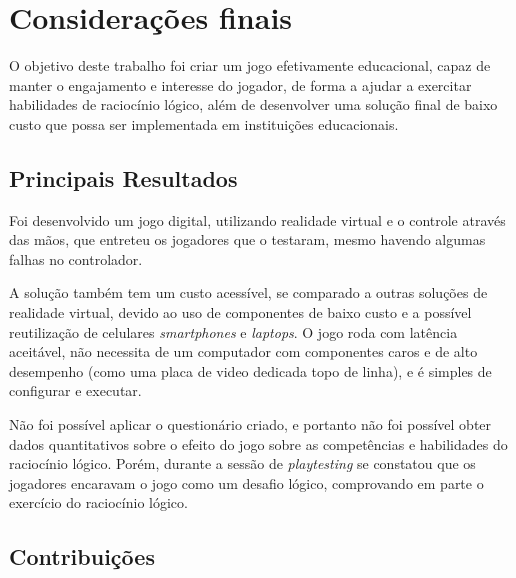 
\chapter{Considerações finais}\label{cap-consideracoes-finais}

O objetivo deste trabalho foi criar um jogo efetivamente educacional, capaz de manter o engajamento e interesse do jogador, de forma a ajudar a exercitar habilidades de raciocínio lógico, além de desenvolver uma solução final de baixo custo que possa ser implementada em instituições educacionais.

\section{Principais Resultados}\label{sec-conc-resultados}

Foi desenvolvido um jogo digital, utilizando realidade virtual e o controle através das mãos, que entreteu os jogadores que o testaram, mesmo havendo algumas falhas no controlador. 

A solução também tem um custo acessível, se comparado a outras soluções de realidade virtual, devido ao uso de componentes de baixo custo e a possível reutilização de celulares \textit{smartphones} e \textit{laptops}. O jogo roda com latência aceitável, não necessita de um computador com componentes caros e de alto desempenho (como uma placa de video dedicada topo de linha), e é simples de configurar e executar.

Não foi possível aplicar o questionário criado, e portanto não foi possível obter dados quantitativos sobre o efeito do jogo sobre as competências e habilidades do raciocínio lógico. Porém, durante a sessão de \textit{playtesting} se constatou que os jogadores encaravam o jogo como um desafio lógico, comprovando em parte o exercício do raciocínio lógico.

\section{Contribuições}\label{sec-conc-contribuicoes}

